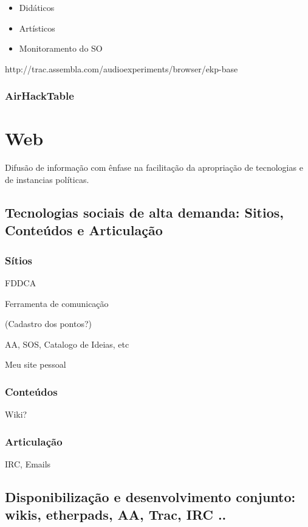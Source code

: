 \begin{itemize}
    \item Didáticos
    \item Artísticos
    \item Monitoramento do SO
\end{itemize}

http://trac.assembla.com/audioexperiments/browser/ekp-base


      \subsubsection{AirHackTable}



  \section{Web}

  Difusão de informação com ênfase na facilitação
  da apropriação de tecnologias e de instancias políticas.

      \subsection{Tecnologias sociais de alta demanda: Sitios, Conteúdos e Articulação}

      \subsubsection{Sítios}

      FDDCA

      Ferramenta de comunicação

      (Cadastro dos pontos?)

      AA, SOS, Catalogo de Ideias, etc

      Meu site pessoal


      \subsubsection{Conteúdos}

      Wiki?

      \subsubsection{Articulação}

      IRC, Emails

\subsection{Disponibilização e desenvolvimento conjunto: wikis, etherpads, AA, Trac, IRC ..}

